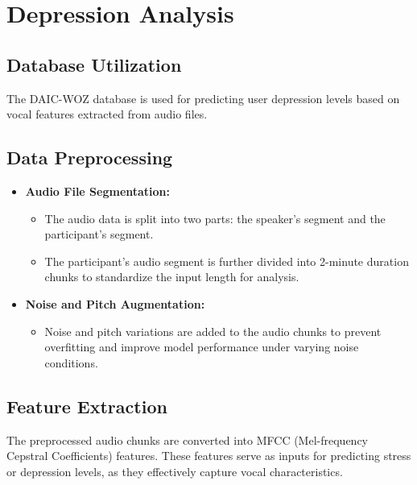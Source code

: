 \section{Depression Analysis}

\subsection{Database Utilization}
The DAIC-WOZ database is used for predicting user depression levels based on vocal features extracted from audio files.

\subsection{Data Preprocessing}
\begin{itemize}
    \item \textbf{Audio File Segmentation:}
    \begin{itemize}
        \item The audio data is split into two parts: the speaker's segment and the participant's segment.
        \item The participant's audio segment is further divided into 2-minute duration chunks to standardize the input length for analysis.
    \end{itemize}
    \item \textbf{Noise and Pitch Augmentation:}
    \begin{itemize}
        \item Noise and pitch variations are added to the audio chunks to prevent overfitting and improve model performance under varying noise conditions.
    \end{itemize}
\end{itemize}

\subsection{Feature Extraction}
The preprocessed audio chunks are converted into MFCC (Mel-frequency Cepstral Coefficients) features. These features serve as inputs for predicting stress or depression levels, as they effectively capture vocal characteristics.

